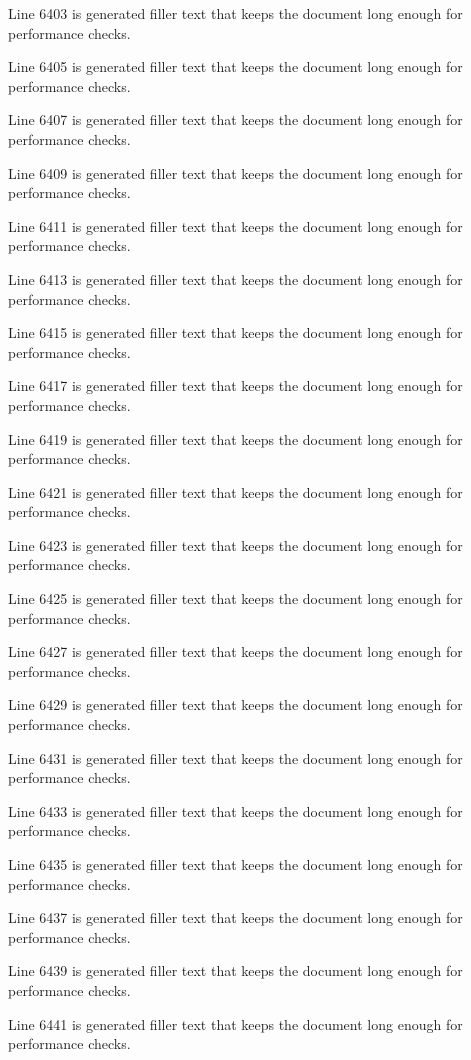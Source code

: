 Line 6403 is generated filler text that keeps the document long enough for performance checks.

Line 6405 is generated filler text that keeps the document long enough for performance checks.

Line 6407 is generated filler text that keeps the document long enough for performance checks.

Line 6409 is generated filler text that keeps the document long enough for performance checks.

Line 6411 is generated filler text that keeps the document long enough for performance checks.

Line 6413 is generated filler text that keeps the document long enough for performance checks.

Line 6415 is generated filler text that keeps the document long enough for performance checks.

Line 6417 is generated filler text that keeps the document long enough for performance checks.

Line 6419 is generated filler text that keeps the document long enough for performance checks.

Line 6421 is generated filler text that keeps the document long enough for performance checks.

Line 6423 is generated filler text that keeps the document long enough for performance checks.

Line 6425 is generated filler text that keeps the document long enough for performance checks.

Line 6427 is generated filler text that keeps the document long enough for performance checks.

Line 6429 is generated filler text that keeps the document long enough for performance checks.

Line 6431 is generated filler text that keeps the document long enough for performance checks.

Line 6433 is generated filler text that keeps the document long enough for performance checks.

Line 6435 is generated filler text that keeps the document long enough for performance checks.

Line 6437 is generated filler text that keeps the document long enough for performance checks.

Line 6439 is generated filler text that keeps the document long enough for performance checks.

Line 6441 is generated filler text that keeps the document long enough for performance checks.

